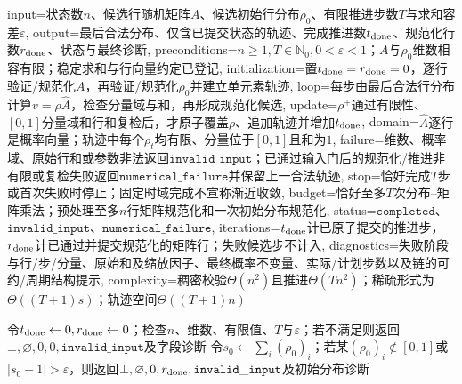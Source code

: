 \begin{AlgorithmContract}{
  input={状态数$n$、候选行随机矩阵$A$、候选初始行分布$\rho_0$、有限推进步数$T$与求和容差$\varepsilon$},
  output={最后合法分布、仅含已提交状态的轨迹、完成推进数$t_{\rm done}$、规范化行数$r_{\rm done}$、状态与最终诊断},
  preconditions={$n\ge1,T\in\mathbb N_0,0<\varepsilon<1$；$A$与$\rho_0$维数相容有限；稳定求和与行向量约定已登记},
  initialization={置$t_{\rm done}=r_{\rm done}=0$，逐行验证/规范化$A$，再验证/规范化$\rho_0$并建立单元素轨迹},
  loop={每步由最后合法行分布计算$v=\rho\widehat A$，检查分量域与和，再形成规范化候选},
  update={$\rho^+$通过有限性、$[0,1]$分量域和行和复检后，才原子覆盖$\rho$、追加轨迹并增加$t_{\rm done}$},
  domain={$\widehat A$逐行是概率向量；轨迹中每个$\rho_t$均有限、分量位于$[0,1]$且和为$1$},
  failure={维数、概率域、原始行和或参数非法返回$\mathtt{invalid\_input}$；已通过输入门后的规范化/推进非有限或复检失败返回$\mathtt{numerical\_failure}$并保留上一合法轨迹},
  stop={恰好完成$T$步或首次失败时停止；固定时域完成不宣称渐近收敛},
  budget={恰好至多$T$次分布--矩阵乘法；预处理至多$n$行矩阵规范化和一次初始分布规范化},
  status={$\mathtt{completed}$、$\mathtt{invalid\_input}$、$\mathtt{numerical\_failure}$},
  iterations={$t_{\rm done}$计已原子提交的推进步，$r_{\rm done}$计已通过并提交规范化的矩阵行；失败候选步不计入},
  diagnostics={失败阶段与行/步/分量、原始和及缩放因子、最终概率不变量、实际/计划步数以及链的可约/周期结构提示},
  complexity={稠密校验$\Theta(n^2)$且推进$\Theta(Tn^2)$；稀疏形式为$\Theta((T+1)s)$；轨迹空间$\Theta((T+1)n)$}
}
\begin{algorithm}[H]
\caption{有限状态链的分布推进与合法性检查}\label{alg:V5-C01-distribution-propagation}
令$t_{\rm done}\leftarrow0,r_{\rm done}\leftarrow0$；检查$n$、维数、有限值、$T$与$\varepsilon$；若不满足则返回$\bot,\varnothing,0,0,\mathtt{invalid\_input}$及字段诊断\;
令$s_0\leftarrow\sum_i(\rho_0)_i$；若某$(\rho_0)_i\notin[0,1]$或$|s_0-1|>\varepsilon$，则返回$\bot,\varnothing,0,r_{\rm done},\mathtt{invalid\_input}$及初始分布诊断\;

\end{algorithm}
\end{AlgorithmContract}
